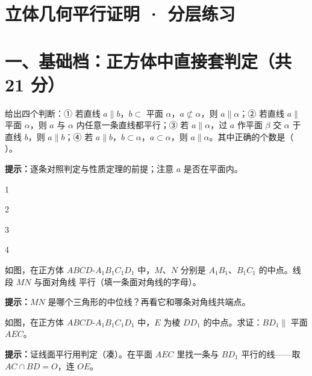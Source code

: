 \documentclass{exam-zh}
\begin{document}
\section*{立体几何平行证明 · 分层练习}

\section*{一、基础档：正方体中直接套判定（共 21 分）}


\begin{question}[points=5]
  给出四个判断：① 若直线 $a\parallel b$，$b\subset$ 平面 $\alpha$，$a\not\subset\alpha$，则 $a\parallel\alpha$；② 若直线 $a\parallel$ 平面 $\alpha$，则 $a$ 与 $\alpha$ 内任意一条直线都平行；③ 若 $a\parallel\alpha$，过 $a$ 作平面 $\beta$ 交 $\alpha$ 于直线 $b$，则 $a\parallel b$；④ 若 $a\parallel b$，$b\subset\alpha$，$a\subset\alpha$，则 $a\parallel\alpha$。其中正确的个数是（    ）。
  \begin{hintbox}
\textbf{提示：}逐条对照判定与性质定理的前提；注意 $a$ 是否在平面内。\end{hintbox}

  \begin{choices}
    \item 1
    \item 2
    \item 3
    \item 4
  \end{choices}
\end{question}



\begin{question}[points=6]
  如图，在正方体 $ABCD$-$A_{1}B_{1}C_{1}D_{1}$ 中，$M$、$N$ 分别是 $A_{1}B_{1}$、$B_{1}C_{1}$ 的中点。线段 $MN$ 与面对角线 \underline{\hspace{3em}} 平行（填一条面对角线的字母）。
  \begin{hintbox}
\textbf{提示：}$MN$ 是哪个三角形的中位线？再看它和哪条对角线共端点。\end{hintbox}

\end{question}



\begin{problem}[points=10]
    如图，在正方体 $ABCD$-$A_{1}B_{1}C_{1}D_{1}$ 中，$E$ 为棱 $DD_{1}$ 的中点。求证：$BD_{1}\parallel$ 平面 $AEC$。

    \begin{hintbox}
\textbf{提示：}证线面平行用判定（凑）。在平面 $AEC$ 里找一条与 $BD_{1}$ 平行的线——取 $AC\cap BD=O$，连 $OE$。\end{hintbox}

  \answerarea[55mm]
\end{problem}
\end{document}
